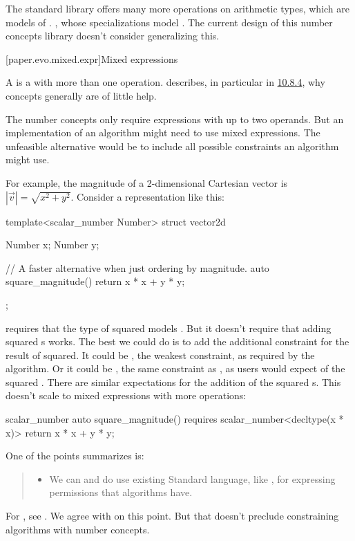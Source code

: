 \pnum
The \Cpp{} standard library offers many more operations on arithmetic types,
which are models of .
,
whose specializations model .
The current design of this number concepts library doesn't consider generalizing this.

[paper.evo.mixed.expr]{Mixed expressions}

\pnum
A  is a  with more than one operation.
\hrefVI{} describes,
in particular in \href{https://wg21.link/P1673R12#generalizing-associativity-helps-little}{10.8.4},
why concepts generally are of little help.

\pnum
The number concepts only require expressions with up to two operands.
But an implementation of an algorithm might need to use mixed expressions.
The unfeasible alternative would be to include all possible constraints an algorithm might use.

\pnum
For example, the magnitude of a 2-dimensional Cartesian vector is $|\vec{v}| = \sqrt{x^2 + y^2}$.
Consider a \Cpp{} representation like this:
\begin{codeblock}
template<scalar_number Number>
struct vector2d {
  Number x;
  Number y;

  // A faster alternative when just ordering by magnitude.
  auto square_magnitude() { return x * x + y * y; }
};
\end{codeblock}
 requires that the type of  squared models .
But it doesn't require that adding squared s works.
The best we could do is to add the additional constraint for the result of  squared.
It could be , the weakest constraint, as required by the algorithm.
Or it could be , the same constraint as , as users would expect of the squared .
There are similar expectations for the addition of the squared s.
This doesn't scale to mixed expressions with more operations:
\begin{codeblock}
scalar_number auto square_magnitude() requires scalar_number<decltype(x * x)> {
  return x * x + y * y;
}
\end{codeblock}

\pnum
One of the points \hrefVI{} summarizes is:
\begin{quote}
\begin{itemize}
\item
We can and do use existing Standard language, like ,
for expressing permissions that algorithms have.
\end{itemize}
\end{quote}
For , see .
We agree with \hrefVI{} on this point.
But that doesn't preclude constraining algorithms with number concepts.

